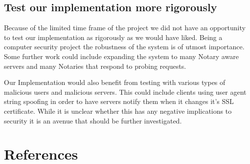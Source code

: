 \documentclass[preprint,review,12pt]{elsarticle}
\begin{document}
\subsection{Test our implementation more rigorously}

Because of the limited time frame of the project we did not have an opportunity
to test our implementation as rigorously as we would have liked. Being a
computer security project the robustness of the system is of utmost importance.
Some further work could include expanding the system to many Notary aware
servers and many Notaries that respond to probing requests.

Our Implementation would also benefit from testing with various types of
malicious users and malicious servers. This could include clients using user
agent string spoofing in order to have servers notify them when it changes it's
SSL certificate.  While it is unclear whether this has any negative
implications to security it is an avenue that should be further investigated.

\section{References}
\label{references}
\nocite{*}


\end{document}
